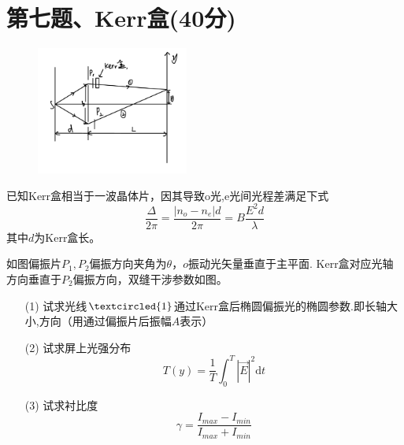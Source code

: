 \documentclass{article}
\begin{document}
\section*{第七题、Kerr盒(40分)}
\begin{figure}
	\vspace{-15pt}    %
	\includegraphics[width=5cm]{img/0013.1.jpeg}\\
	\vspace{-15pt}    %
	\caption{}
	\vspace{-15pt}    %
\end{figure}
 已知Kerr盒相当于一波晶体片，因其导致o光,e光间光程差满足下式$$\dfrac{\Delta}{2\pi}=\dfrac{|n_o-n_e|d}{2\pi}=B\dfrac{E^2 d}{\lambda}$$其中$d$为Kerr盒长。\par
如图偏振片$P_1, P_2$偏振方向夹角为$\theta$，$o$振动光矢量垂直于主平面.
Kerr盒对应光轴方向垂直于$P_2$偏振方向，双缝干涉参数如图。
\begin{itemize}
    \item[(1)] 试求光线$\textcircled{1}$通过Kerr盒后椭圆偏振光的椭圆参数.即长轴大小,方向（用通过偏振片后振幅$A$表示）
    \item[(2)] 试求屏上光强分布$$T(y)=\dfrac{1}{T}\int^T_0|\vec{E}|^2\mathrm{d} t$$
    \item[(3)] 试求衬比度$$\gamma=\dfrac{I_{max}-I_{min}}{I_{max}+I_{min}}$$
\end{itemize}
\end{document}
